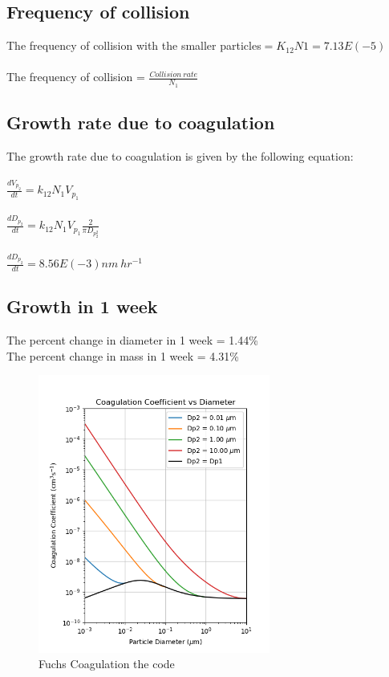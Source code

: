 \documentclass[12pt]{article}
\begin{document}
\subsection{Frequency of collision}\label{subsec:problem-2-b}
The frequency of collision with the smaller particles$=K_{12}N1=7.13E(-5)$
\\\\
The frequency of collision =  $\displaystyle\frac{Collision\ rate}{N_1}$

\subsection{Growth rate due to coagulation}\label{subsec:problem-2-c}
The growth rate due to coagulation is given by the following equation:
\\ \\
$\displaystyle \frac{dV_p_2}{dt}=k_{12} N_1 V_p_1 $
\\ \\
$\displaystyle \frac{dD_p_2}{dt}=k_{12} N_1 V_p_1 \frac{2}{\pi D_p_2^2}$
\\ \\
$\displaystyle \frac{dD_p_2}{dt}= 8.56E(-3) nm\ hr^{-1}$

\subsection{Growth in 1 week}\label{subsec:problem-2-d}
The percent change in diameter in 1 week = 1.44\%
\\
The percent change in mass in 1 week = 4.31\%
\newpage

\begin{figure}\label{fig:problem-2-a-1}
\begin{center}
\includegraphics[width=3in]{hw2_pr2_1_coagulation_coefficient_vs_diameter}
\caption{Fuchs Coagulation the code}
\end{center}
\end{figure}
\end{document}
